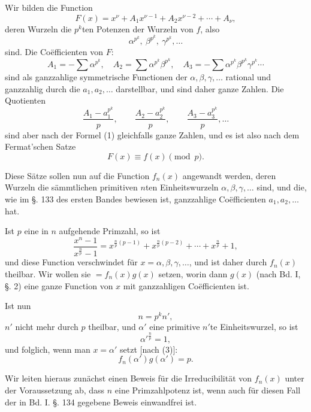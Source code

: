 \documentclass[11pt]{article}
\begin{document}
Wir bilden die Function
\[
F(x)=x^\nu+A_1x^{\nu-1}+A_2x^{\nu-2}+\cdots+A_\nu,
\]
deren Wurzeln die $p^k$ten Potenzen der Wurzeln von $f$, also
\[
\alpha^{p^k},\ \beta^{p^k},\ \gamma^{p^k},\ldots
\]
sind. Die Coëfficienten von $F$:
\[
A_1=-\sum\alpha^{p^k},\quad
A_2=\sum\alpha^{p^k}\beta^{p^k},\quad
A_3=-\sum\alpha^{p^k}\beta^{p^k}\gamma^{p^k}\cdots
\]
sind als ganzzahlige symmetrische Functionen der $\alpha,\beta,\gamma,\ldots$ rational und ganzzahlig durch die $a_1,a_2,\ldots$ darstellbar, und sind daher ganze Zahlen. Die Quotienten
\[
\frac{A_1-a_1^{p^k}}{p},\qquad
\frac{A_2-a_2^{p^k}}{p},\qquad
\frac{A_3-a_3^{p^k}}{p},\ldots
\]
sind aber nach der Formel (1) gleichfalls ganze Zahlen, und es ist also nach dem Fermat'schen Satze
\begin{equation}\tag{2}
F(x)\equiv f(x) \pmod p.
\end{equation}

Diese Sätze sollen nun auf die Function $f_n(x)$ angewandt werden, deren Wurzeln die sämmtlichen primitiven $n$ten Einheitswurzeln $\alpha,\beta,\gamma,\ldots$ sind,
 und die, wie im §. 133 des ersten Bandes bewiesen ist, ganzzahlige Coëfficienten $a_1,a_2,\ldots$ hat.

Ist $p$ eine in $n$ aufgehende Primzahl, so ist
\begin{equation}\tag{3}
\frac{x^n-1}{x^{\frac np}-1}
=x^{\frac np(p-1)}+x^{\frac np(p-2)}+\cdots+x^{\frac np}+1,
\end{equation}
und diese Function verschwindet für $x=\alpha,\beta,\gamma,\ldots$, und ist daher durch $f_n(x)$ theilbar. Wir wollen sie $=f_n(x)g(x)$ setzen, worin dann $g(x)$ (nach Bd. I, §. 2) eine ganze Function von $x$ mit ganzzahligen Coëfficienten ist.

Ist nun
\[
n=p^k n',
\]
$n'$ nicht mehr durch $p$ theilbar, und $\alpha'$ eine primitive $n'$te Einheitswurzel, so ist
\[
\alpha'^{\frac np}=1,
\]
und folglich, wenn man $x=\alpha'$ setzt [nach (3)]:
\begin{equation}\tag{4}
f_n(\alpha')g(\alpha')=p.
\end{equation}

Wir leiten hieraus zunächst einen Beweis für die Irreducibilität von $f_n(x)$ unter der Voraussetzung ab, dass $n$ eine Primzahlpotenz ist, wenn auch für diesen Fall der in Bd. I. §. 134 gegebene Beweis einwandfrei ist.
\end{document}
